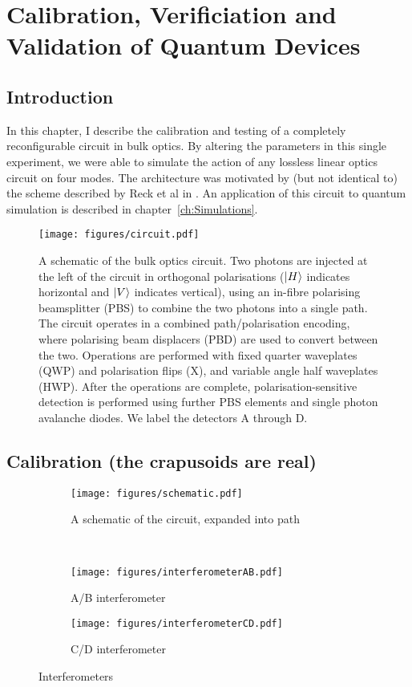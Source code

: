 \chapter{Calibration, Verificiation and Validation of Quantum Devices}
\label{ch:QCVV}
\section{Introduction}
In this chapter, I describe the calibration and testing of a completely
reconfigurable circuit in bulk optics. By altering the parameters in this single
experiment, we were able to simulate the action of any lossless linear optics
circuit on four modes. The architecture was motivated by (but not identical to)
the scheme described by Reck et al in \cite{reck94}. An application of this
circuit to quantum simulation is described in chapter~\ref{ch:Simulations}.

\begin{figure}
  \centering
  \texttt{[image: figures/circuit.pdf]}
  \caption{A schematic of the bulk optics circuit. Two photons are injected at
the left of the circuit in orthogonal polarisations (\(\left|H\right\rangle\) indicates
horizontal and \(\left|V\right\rangle\) indicates vertical), using an in-fibre polarising
beamsplitter
(PBS) to combine the two photons into a single path. The circuit operates in a
combined path/polarisation encoding, where polarising beam displacers (PBD) are
used to convert between the two. Operations are performed with fixed quarter
waveplates (QWP) and polarisation flips (X), and variable angle half waveplates
(HWP). After the operations are complete, polarisation-sensitive detection is
performed using further PBS elements and single photon avalanche diodes. We
label the detectors A through D.}
  \label{fig:circuit}
\end{figure}

\section{Calibration (the crapusoids are real)}

\begin{figure}
  \centering
  \begin{subfigure}{\textwidth}
    \texttt{[image: figures/schematic.pdf]}
    \caption{A schematic of the circuit, expanded into path}
    \label{fig:schematic}
  \end{subfigure} \\
  \vspace{1cm}
  \begin{subfigure}{0.45\textwidth}
    \texttt{[image: figures/interferometerAB.pdf]}
    \caption{A/B interferometer}
    \label{fig:ab}
  \end{subfigure}
  \hspace{0.05\textwidth}
  \begin{subfigure}{0.45\textwidth}
    \texttt{[image: figures/interferometerCD.pdf]}
    \caption{C/D interferometer}
    \label{fig:cd}
  \end{subfigure}
  \caption{Interferometers}
  \label{fig:interferometers}
\end{figure}

